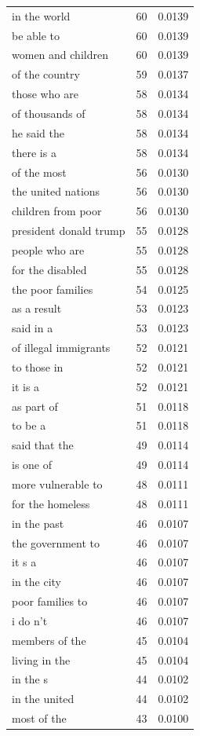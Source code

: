 \begin{tabular}{lrl}
in the world & 60 & 0.0139 \\
be able to & 60 & 0.0139 \\
women and children & 60 & 0.0139 \\
of the country & 59 & 0.0137 \\
those who are & 58 & 0.0134 \\
of thousands of & 58 & 0.0134 \\
he said the & 58 & 0.0134 \\
there is a & 58 & 0.0134 \\
of the most & 56 & 0.0130 \\
the united nations & 56 & 0.0130 \\
children from poor & 56 & 0.0130 \\
president donald trump & 55 & 0.0128 \\
people who are & 55 & 0.0128 \\
for the disabled & 55 & 0.0128 \\
the poor families & 54 & 0.0125 \\
as a result & 53 & 0.0123 \\
said in a & 53 & 0.0123 \\
of illegal immigrants & 52 & 0.0121 \\
to those in & 52 & 0.0121 \\
it is a & 52 & 0.0121 \\
as part of & 51 & 0.0118 \\
to be a & 51 & 0.0118 \\
said that the & 49 & 0.0114 \\
is one of & 49 & 0.0114 \\
more vulnerable to & 48 & 0.0111 \\
for the homeless & 48 & 0.0111 \\
in the past & 46 & 0.0107 \\
the government to & 46 & 0.0107 \\
it s a & 46 & 0.0107 \\
in the city & 46 & 0.0107 \\
poor families to & 46 & 0.0107 \\
i do n't & 46 & 0.0107 \\
members of the & 45 & 0.0104 \\
living in the & 45 & 0.0104 \\
in the s & 44 & 0.0102 \\
in the united & 44 & 0.0102 \\
most of the & 43 & 0.0100 \\

\end{tabular}
